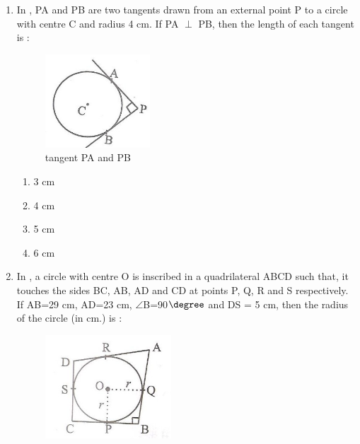 \begin{enumerate}

\item In , PA and PB are two tangents drawn from an external point P to a
circle with centre C and radius 4 cm. If PA $\perp$ PB, then the length of each
tangent is :
\begin{figure}[H]
			\centering
			\includegraphics[width=\columnwidth]{figs/1.png}
\caption{tangent PA and PB}
    \label{fig:fig1}
		\end{figure}
 \begin{enumerate}
    \item 3 cm\\
    \item 4 cm\\
    \item 5 cm\\
    \item 6 cm
 \end{enumerate}
\item In , a circle with centre O is inscribed in a quadrilateral ABCD such
that, it touches the sides BC, AB, AD and CD at points P, Q, R and S respectively. If AB=29 cm, AD=23 cm, $\angle$B=90$\degree$ and DS = 5 cm, then the radius of the circle (in cm.) is : \\
		\begin{figure}
			\centering
\includegraphics[width=0.5\columnwidth]{figs/2.png}

\end{figure}
\end{enumerate}
